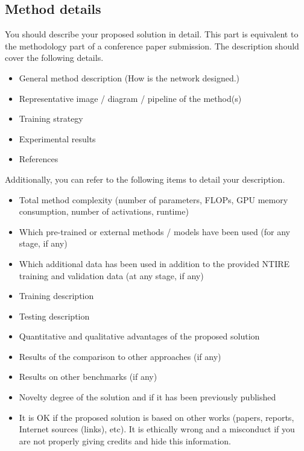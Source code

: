 \documentclass[10pt,twocolumn,letterpaper]{article}
\begin{document}
\subsection{Method details}

You should describe your proposed solution in detail. This part is equivalent to the methodology part of a conference paper submission. The description should cover the following details.

\begin{itemize}
\item General method description (How is the network designed.)                                
\item Representative image / diagram / pipeline of the method(s)  
\item Training strategy
\item Experimental results
\item References                                               
\end{itemize}

Additionally, you can refer to the following items to detail your description.
\begin{itemize}
\item Total method complexity (number of parameters, FLOPs, GPU memory consumption, number of activations, runtime)
\item Which pre-trained or external methods / models have been used (for any stage, if any) 
\item Which additional data has been used in addition to the provided NTIRE training and validation data (at any stage, if any) 
\item Training description
\item Testing description
\item Quantitative and qualitative advantages of the proposed solution
\item Results of the comparison to other approaches (if any)
\item Results on other benchmarks (if any)
\item Novelty degree of the solution and if it has been previously published
\item It is OK if the proposed solution is based on other works (papers, reports, Internet sources (links), etc). It is ethically wrong and a misconduct if you are not properly giving credits and hide this information.
\end{itemize}
\end{document}
